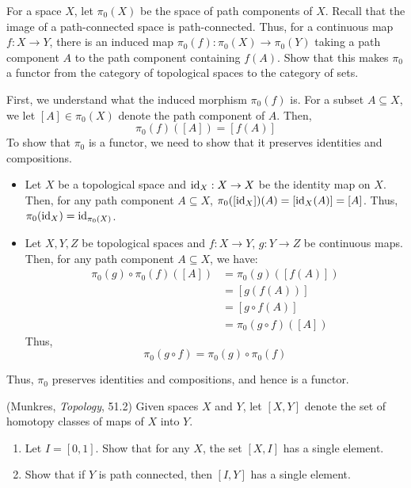 \documentclass[12pt]{article}
\begin{document}
\begin{problab}{5}
For a space $X$, let $\pi_0(X)$ be the space of path components of $X$. Recall that the image of a path-connected space is path-connected. Thus, for a continuous map $f: X \to Y$, there is an induced map $\pi_0(f): \pi_0(X) \to \pi_0(Y)$ taking a path component $A$ to the path component containing $f(A)$. Show that this makes $\pi_0$ a functor from the category of topological spaces to the category of sets.
\end{problab}

\begin{solu}
    First, we understand what the induced morphism $\pi_0(f)$ is. For a subset $A \subseteq X$, we let $[A] \in \pi_0(X)$ denote the path component of $A$. Then,
    \[ \pi_0(f)([A]) = [f(A)] \]   
    To show that $\pi_0$ is a functor, we need to show that it preserves identities and compositions.
    \begin{itemize}
        \item Let $X$ be a topological space and $\operatorname{id}_X : X \to X$ be the identity map on $X$. Then, for any path component $A\subseteq X$, $\pi_0([\operatorname{id}_X])(A) = [\operatorname{id}_X(A)] = [A]$. Thus, $\pi_0(\operatorname{id}_X) = \operatorname{id}_{\pi_0(X)}$.
        \item Let $X, Y, Z$ be topological spaces and $f: X \to Y$, $g: Y \to Z$ be continuous maps. Then, for any path component $A \subseteq X$, we have: 
        \begin{align*}
            \pi_0(g) \circ \pi_0(f)([A]) &= \pi_0(g)([f(A)]) \\
            &= [g(f(A))] \\
            &= [g \circ f(A)] \\
            &= \pi_0(g \circ f)([A])
        \end{align*}
        Thus, 
        \[ \pi_0(g \circ f) = \pi_0(g) \circ \pi_0(f) \]
    \end{itemize}
    Thus, $\pi_0$ preserves identities and compositions, and hence is a functor.
\end{solu}
\newpage

\begin{problab}{6} (Munkres, \emph{Topology}, 51.2) Given spaces $X$ and $Y$, let $[X,Y]$ denote the set of homotopy classes of maps of $X$ into $Y$.
\begin{enumerate}
\item Let $I = [0,1]$. Show that for any $X$, the set $[X,I]$ has a single element.
\item Show that if $Y$ is path connected, then $[I,Y]$ has a single element.
\end{enumerate}
\end{problab}
\end{document}
